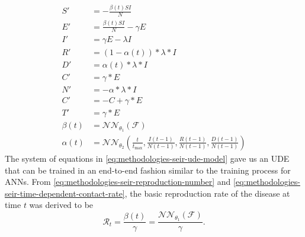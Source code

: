 \begin{equation}
    \begin{aligned}
        S' &= - \frac{\beta(t) SI}{N} \\
        E' &= \frac{\beta(t) SI}{N} - \gamma E \\
        I' &= \gamma E - \lambda I \\
        R' &= (1 - \alpha(t)) * \lambda * I \\
        D' &= \alpha(t) * \lambda * I \\
        C' &= \gamma * E \\
        N' &= - \alpha * \lambda * I \\
        C' &= -C + \gamma * E \\
        T' &= \gamma * E \\
        \beta(t) &= \mathcal{NN}_{\theta_1}(\mathcal{F}) \\
        \alpha(t) &= \mathcal{NN}_{\theta_2} (\frac{t}{t_\text{max}}, \frac{I(t-1)}{N(t-1)}, \frac{R(t-1)}{N(t-1)}, \frac{D(t-1)}{N(t-1)})
    \end{aligned}
    \label{eq:methodologies-seir-ude-model}
\end{equation}
The system of equations in \autoref{eq:methodologies-seir-ude-model} gave us an \gls{UDE} \cite{rackauckasUniversalDifferentialEquations2020} that can be trained in an end-to-end fashion similar to the training process for \glspl{ANN}.
From \autoref{eq:methodologies-seir-reproduction-number} and \autoref{eq:methodologies-seir-time-dependent-contact-rate}, the basic reproduction rate of the disease at time $t$ was derived to be
\begin{equation}
    \mathcal{R}_t = \frac{\beta(t)}{\gamma} = \frac{\mathcal{NN}_{\theta_1}(\mathcal{F})}{\gamma}.
\end{equation}

